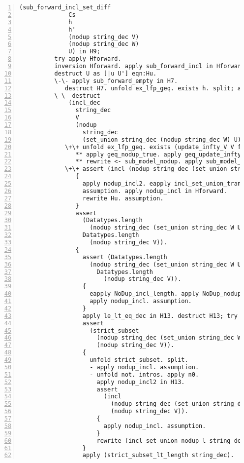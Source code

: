 \begin{lstlisting}[language=Coq, label={lst:thm32}, caption={Full proof of Theorem 3.2 in Coq}, numbers=left]
            (sub_forward_incl_set_diff
              Cs
              h
              h'
              (nodup string_dec V)
              (nodup string_dec W)
              U) in H9;
          try apply Hforward.
          inversion Hforward. apply sub_forward_incl in Hforward.
          destruct U as [|u U'] eqn:Hu.
          \-\- apply sub_forward_empty in H7.
             destruct H7. unfold ex_lfp_geq. exists h. split; assumption.
          \-\- destruct
              (incl_dec
                string_dec
                V
                (nodup
                  string_dec
                  (set_union string_dec (nodup string_dec W) U))).
             \+\+ unfold ex_lfp_geq. exists (update_infty_V V f). split.
                ** apply geq_nodup_true. apply geq_update_infty_V.
                ** rewrite <- sub_model_nodup. apply sub_model_update_infty_V.
             \+\+ assert (incl (nodup string_dec (set_union string_dec W U)) V).
                {
                  apply nodup_incl2. eapply incl_set_union_trans.
                  assumption. apply nodup_incl in Hforward.
                  rewrite Hu. assumption.
                }
                assert
                  (Datatypes.length
                    (nodup string_dec (set_union string_dec W U)) <
                  Datatypes.length
                    (nodup string_dec V)).
                {
                  assert (Datatypes.length
                    (nodup string_dec (set_union string_dec W U)) <=
                      Datatypes.length
                        (nodup string_dec V)).
                  {
                    eapply NoDup_incl_length. apply NoDup_nodup.
                    apply nodup_incl. assumption.
                  }
                  apply le_lt_eq_dec in H13. destruct H13; try assumption.
                  assert
                    (strict_subset
                      (nodup string_dec (set_union string_dec W U))
                      (nodup string_dec V)).
                  {
                    unfold strict_subset. split.
                    - apply nodup_incl. assumption.
                    - unfold not. intros. apply n0.
                      apply nodup_incl2 in H13.
                      assert
                        (incl
                          (nodup string_dec (set_union string_dec W U))
                          (nodup string_dec V)).
                      {
                        apply nodup_incl. assumption.
                      }
                      rewrite (incl_set_union_nodup_l string_dec). assumption.
                  }
                  apply (strict_subset_lt_length string_dec).

\end{lstlisting}
